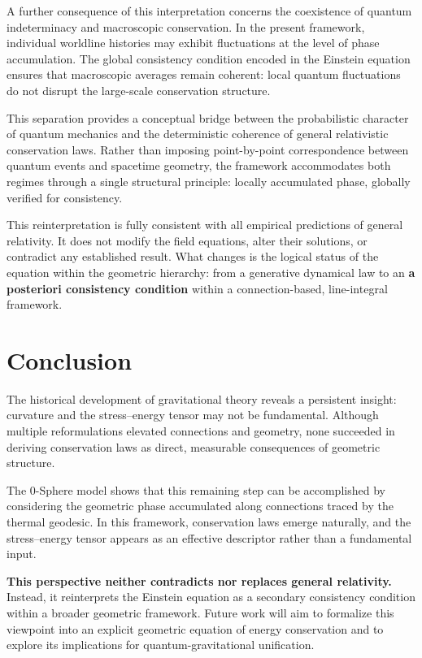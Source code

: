 \documentclass[%
 reprint,
 amsmath,amssymb,
 aps,
 prb,
]{revtex4-2}
\numberwithin{equation}{section}
\begin{document}
A further consequence of this interpretation concerns the coexistence of quantum indeterminacy and macroscopic conservation. In the present framework, individual worldline histories may exhibit fluctuations at the level of phase accumulation. The global consistency condition encoded in the Einstein equation ensures that macroscopic averages remain coherent: local quantum fluctuations do not disrupt the large-scale conservation structure.

This separation provides a conceptual bridge between the probabilistic character of quantum mechanics and the deterministic coherence of general relativistic conservation laws. Rather than imposing point-by-point correspondence between quantum events and spacetime geometry, the framework accommodates both regimes through a single structural principle: locally accumulated phase, globally verified for consistency.

This reinterpretation is fully consistent with all empirical predictions of general relativity. It does not modify the field equations, alter their solutions, or contradict any established result. What changes is the logical status of the equation within the geometric hierarchy: from a generative dynamical law to an \textbf{a posteriori consistency condition} within a connection-based, line-integral framework.

\section{Conclusion}
\label{sec:conclusion}

The historical development of gravitational theory reveals a persistent insight: curvature and the stress--energy tensor may not be fundamental. Although multiple reformulations elevated connections and geometry, none succeeded in deriving conservation laws as direct, measurable consequences of geometric structure.

The 0-Sphere model shows that this remaining step can be accomplished by considering the geometric phase accumulated along connections traced by the thermal geodesic. In this framework, conservation laws emerge naturally, and the stress--energy tensor appears as an effective descriptor rather than a fundamental input.

\textbf{This perspective neither contradicts nor replaces general relativity.} Instead, it reinterprets the Einstein equation as a secondary consistency condition within a broader geometric framework. Future work will aim to formalize this viewpoint into an explicit geometric equation of energy conservation and to explore its implications for quantum-gravitational unification.
\end{document}

